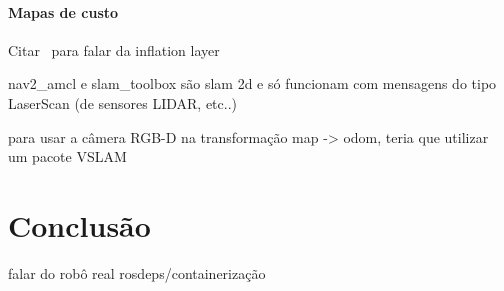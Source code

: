 \documentclass[repeatfields,xlists,xpacks,oneside,yearsonly]{ufrgscca}
\begin{document}
\subsubsection{Mapas de custo}

Citar~\cite{ros_tuning_guide} para falar da inflation layer

nav2\_amcl e slam\_toolbox são slam 2d e só funcionam com mensagens do tipo LaserScan
(de sensores LIDAR, etc..)

para usar a câmera RGB-D na transformação map -> odom, teria que utilizar um pacote VSLAM


\chapter{Conclusão}
\label{conclusao}

falar do robô real
rosdeps/containerização


\printbibliography

\begin{appendix}

\end{appendix}


\begin{annex}
\end{annex}
\end{document}
